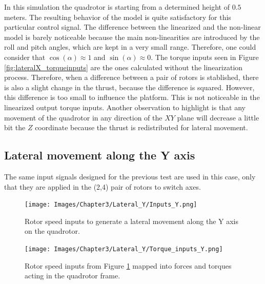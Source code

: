 In this simulation the quadrotor is starting from a determined height of $0.5$ meters. The resulting behavior of the model is quite satisfactory for this particular control signal. The difference between the linearized and the non-linear model is barely noticeable because the main non-linearities are introduced by the roll and pitch angles, which are kept in a very small range. Therefore, one could consider that $\cos{(\alpha)} \approx 1$ and $\sin{(\alpha)} \approx 0$. The torque inputs seen in Figure \ref{fig:lateralX_torqueinputs} are the ones calculated without the linearization process. Therefore, when a difference between a pair of rotors is stablished, there is also a slight change in the thrust, because the difference is squared. However, this difference is too small to influence the platform. This is not noticeable in the linearized output torque inputs. Another observation to highlight is that any movement of the quadrotor in any direction of the $XY$ plane will decrease a little bit the $Z$ coordinate because the thrust is redistributed for lateral movement. 

\subsection{Lateral movement along the Y axis}

The same input signals designed for the previous test are used in this case, only that they are applied in the (2,4) pair of rotors to switch axes.

\begin{figure}[H]
\centering
\texttt{[image: Images/Chapter3/Lateral\_Y/Inputs\_Y.png]}
\caption{Rotor speed inputs to generate a lateral movement along the Y axis on the quadrotor.}
\label{fig:lateralY_inputs}
\end{figure}

\begin{figure}[H]
\centering
\texttt{[image: Images/Chapter3/Lateral\_Y/Torque\_inputs\_Y.png]}
\caption{Rotor speed inputs from Figure \ref{fig:lateralY_inputs} mapped into forces and torques acting in the quadrotor frame.}
\label{fig:lateralY_torqueinputs}
\end{figure}


